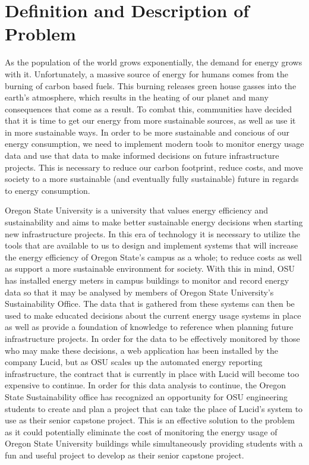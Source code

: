 \documentclass[onecolumn, draftclsnofoot,10pt, compsoc]{IEEEtran}
\begin{document}
\section{Definition and Description of Problem}

	As the population of the world grows exponentially, the demand for energy grows with it. Unfortunately, a massive source of energy for humans comes from
	the burning of carbon based fuels. This burning releases green house gasses into the earth's atmosphere, which results in the heating of our planet and
	many consequences that come as a result. To combat this, communities have decided that it is time to get our energy from more sustainable sources, as well
	as use it in more sustainable ways. In order to be more sustainable and concious of our energy consumption, we need to implement modern tools to monitor
	energy usage data and use that data to make informed decisions on future infrastructure projects. This is necessary to reduce our carbon footprint, reduce costs, and move
	society to a more sustainable (and eventually fully sustainable) future in regards to energy consumption. 
	
	Oregon State University is a university that values energy efficiency and sustainability and aims to make better sustainable energy decisions when starting new infrastructure projects.
	In this era of technology it is necessary to utilize the tools that are available to us to design and implement systems that will increase the energy efficiency of Oregon State's 
	campus as a whole; to reduce costs as well as support a more sustainable environment for society. With this in mind, OSU has installed energy meters in campus buildings 
	to monitor and record energy data so that it may be analysed by members of Oregon State University's Sustainability Office. The data that is gathered 
	from these systems can then be used to make educated decisions about the current energy usage systems in place as well as provide a foundation of knowledge 
	to reference when planning future infrastructure projects. In order for the data to be effectively monitored by those who may make these decisions, a web 
	application has been installed by the company Lucid, but as OSU scales up the automated energy reporting infrastructure, the contract that is currently in place
	with Lucid will become too expensive to continue. In order for this data analysis to continue, the Oregon State Sustainability office has recognized an 
	opportunity for OSU engineering students to create and plan a project that can take the place of Lucid's system to use as their senior capstone project. 
	This is an effective solution to the problem as it could potentially eliminate the cost of monitoring the energy usage of Oregon State University buildings
	while simultaneously providing students with a fun and useful project to develop as their senior capstone project.
\end{document}
